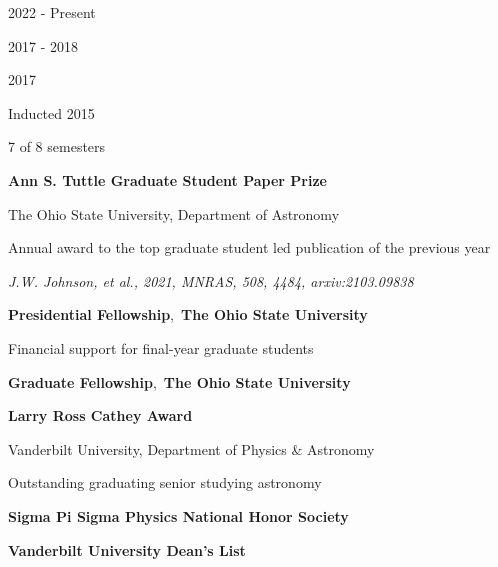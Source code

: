 \documentclass[cv.tex]{subfiles}
\begin{document}
\parbox{0.18\textwidth}{%
	 \par
	\null \par
	\null \par
	\null \par
	2022 - Present \par
	\null \par
	2017 - 2018 \par
	2017 \par
	\null \par
	\null \par
	Inducted 2015 \par
	7 of 8 semesters
}
\hspace{1mm}
\parbox{0.8\textwidth}{%
	\vspace{1mm}
	\textbf{Ann S. Tuttle Graduate Student Paper Prize} \par
	The Ohio State University, Department of Astronomy \par
	Annual award to the top graduate student led publication of the previous
	year \par
	\textit{J.W. Johnson, et al., 2021, MNRAS, 508, 4484, arxiv:2103.09838} \par
	\textbf{Presidential Fellowship},~\textbf{The Ohio State University} \par
	Financial support for final-year graduate students \par
	\textbf{Graduate Fellowship},~\textbf{The Ohio State University} \par
	\textbf{Larry Ross Cathey Award} \par
	Vanderbilt University, Department of Physics \& Astronomy \par
	Outstanding graduating senior studying astronomy \par
	\textbf{Sigma Pi Sigma Physics National Honor Society} \par
	\textbf{Vanderbilt University Dean's List}
}
\end{document}
